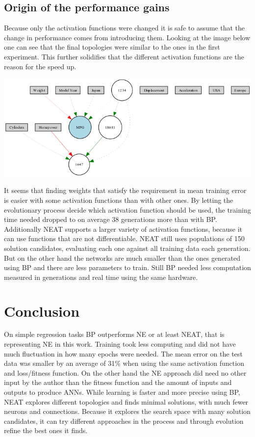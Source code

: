 \documentclass{llncs}
\begin{document}
\subsection{Origin of the performance gains}
%
Because only the activation functions were changed it is safe to assume that the change in performance comes from introducing them. Looking at the image below one can see that the final topologies were similar to the ones in the first experiment. This further solidifies that the different activation functions are the reason for the speed up.
\begin{center}
	\includegraphics[scale=0.45]{Topologie2.png}
\end{center}
%
It seems that finding weights that satisfy the requirement in mean training error is easier with some activation functions than with other ones. By letting the evolutionary process decide which activation function should be used, the training time needed dropped to on average 38 generations more than with BP. Additionally NEAT supports a larger variety of activation functions, because it can use functions that are not differentiable. NEAT still uses populations of 150 solution candidates, evaluating each one against all training data each generation. But on the other hand the networks are much smaller than the ones generated using BP and there are less parameters to train. Still BP needed less computation measured in generations and real time using the same hardware.

\section{Conclusion}
%
On simple regression tasks BP outperforms NE or at least NEAT, that is representing NE in this work. Training took less computing and did not have much fluctuation in how many epochs were needed. The mean error on the test data was smaller by an average of 31\% when using the same activation function and loss/fitness function. On the other hand the NE approach did need no other input by the author than the fitness function and the amount of inputs and outputs to produce ANNs. While learning is faster and more precise using BP, NEAT explores different topologies and finds minimal solutions, with much fewer neurons and connections. Because it explores the search space with many solution candidates, it can try different approaches in the process and through evolution refine the best ones it finds. 
%
\end{document}
